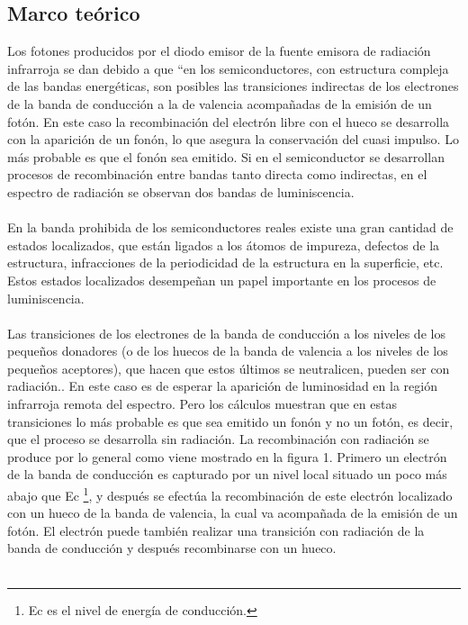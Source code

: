 \documentclass[12]{article}
\newenvironment{Figure}
{\par\medskip\noindent\minipage{\linewidth}}
{\endminipage\par\medskip}
\begin{document}
\begin{multicols}{2}
\section{Marco teórico}
Los fotones producidos por el diodo emisor de la fuente emisora de radiación infrarroja se dan debido a que “en los semiconductores, con estructura compleja de las bandas energéticas, son posibles las transiciones indirectas de los electrones de la banda de conducción  a la de valencia acompañadas de la emisión de un fotón. En este caso la recombinación del electrón libre con el hueco se desarrolla con la aparición de un fonón, lo que asegura la conservación del cuasi impulso. Lo más probable es que el fonón sea emitido. Si en el semiconductor se desarrollan procesos de recombinación entre bandas  tanto directa como indirectas, en el espectro de radiación se observan dos bandas de luminiscencia. \\ \\
En la banda prohibida de los semiconductores reales existe una gran cantidad de estados localizados, que están ligados a los átomos de impureza, defectos de la estructura, infracciones de la periodicidad de la estructura en la superficie, etc. Estos estados localizados desempeñan un papel importante  en los procesos de luminiscencia. \\ \\
Las transiciones de los electrones de la banda de conducción a los niveles de los pequeños donadores (o de los huecos de la banda de valencia a los niveles de los pequeños aceptores),  que hacen que estos últimos se neutralicen, pueden ser con radiación.. En este caso es de esperar la aparición de luminosidad en la región infrarroja remota del espectro. Pero los cálculos  muestran que en estas transiciones lo más probable es que sea emitido un fonón y no un fotón, es decir, que el proceso se desarrolla sin radiación. La recombinación con radiación se produce por lo general  como viene mostrado en la figura 1. Primero un electrón de la banda de conducción es capturado por un nivel local situado un poco más abajo que Ec  \footnote{Ec es el nivel de energía de conducción.}, y después se efectúa la recombinación de este electrón localizado con un hueco de la banda de valencia, la cual va acompañada de la emisión de un fotón. El electrón puede también realizar una transición con radiación de la banda de conducción y después recombinarse con un hueco. \\ \\
\begin{Figure}	

\end{Figure}
\end{multicols}
\end{document}

